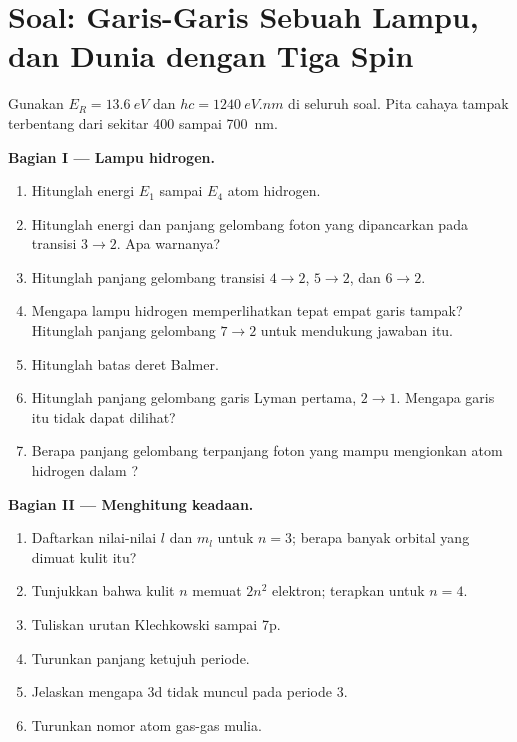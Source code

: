 \section{Soal: Garis-Garis Sebuah Lampu, dan Dunia dengan Tiga Spin}

\begin{problem}
\label{pb:b1:quantum-numbers:1}
Gunakan $E_R = \qty{13.6}{eV}$ dan $hc = \qty{1240}{eV.nm}$ di seluruh
soal. Pita cahaya tampak terbentang dari sekitar 400 sampai \qty{700}{nm}.

\medskip
\noindent\textbf{Bagian I --- Lampu hidrogen.}
\begin{enumerate}
  \item Hitunglah energi $E_1$ sampai $E_4$ atom hidrogen.
  \item Hitunglah energi dan panjang gelombang foton yang dipancarkan
        pada transisi $3 \to 2$. Apa warnanya?
  \item Hitunglah panjang gelombang transisi $4 \to 2$, $5 \to 2$, dan
        $6 \to 2$.
  \item Mengapa lampu hidrogen memperlihatkan tepat empat garis tampak?
        Hitunglah panjang gelombang $7 \to 2$ untuk mendukung jawaban itu.
  \item Hitunglah batas deret Balmer.
  \item Hitunglah panjang gelombang garis Lyman pertama, $2 \to 1$.
        Mengapa garis itu tidak dapat dilihat?
  \item Berapa panjang gelombang terpanjang foton yang mampu mengionkan
        atom hidrogen dalam ?
\end{enumerate}

\medskip
\noindent\textbf{Bagian II --- Menghitung keadaan.}
\begin{enumerate}[resume]
  \item Daftarkan nilai-nilai $l$ dan $m_l$ untuk $n = 3$; berapa banyak
        orbital yang dimuat kulit itu?
  \item Tunjukkan bahwa kulit $n$ memuat $2n^2$ elektron; terapkan untuk
        $n = 4$.
  \item Tuliskan urutan Klechkowski sampai 7p.
  \item Turunkan panjang ketujuh periode.
  \item Jelaskan mengapa  3d tidak muncul pada periode 3.
  \item Turunkan nomor atom gas-gas mulia.
\end{enumerate}


\end{problem}
